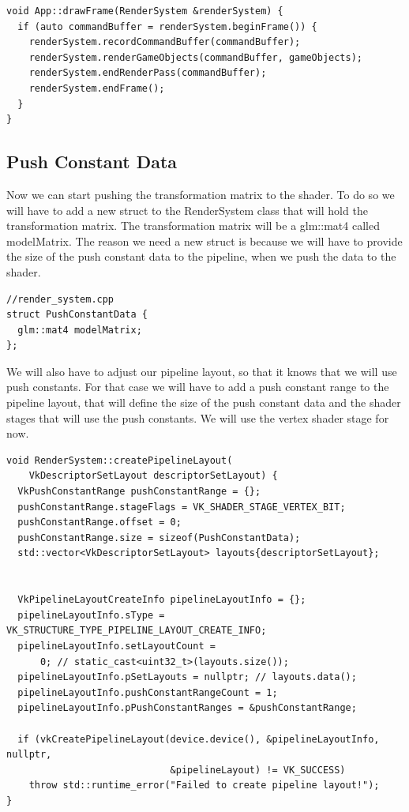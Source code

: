 \documentclass[12pt]{report} \usepackage{preamble}
\begin{document}
\begin{lstlisting}[Language=C++]
void App::drawFrame(RenderSystem &renderSystem) {
  if (auto commandBuffer = renderSystem.beginFrame()) {
    renderSystem.recordCommandBuffer(commandBuffer);
    renderSystem.renderGameObjects(commandBuffer, gameObjects);
    renderSystem.endRenderPass(commandBuffer);
    renderSystem.endFrame();
  }
}
\end{lstlisting}

\subsection{Push Constant Data}

Now we can start pushing the transformation matrix to the shader. To do so we will have to add a new struct to the RenderSystem class that will hold the transformation matrix.
The transformation matrix will be a glm::mat4 called modelMatrix. The reason we need a new struct is because we will have to provide the size of the push constant data to the pipeline,
when we push the data to the shader.

\begin{lstlisting}[Language=C++]
//render_system.cpp
struct PushConstantData {
  glm::mat4 modelMatrix;
};
\end{lstlisting}

We will also have to adjust our pipeline layout, so that it knows that we will use push constants. For that case we will have to add a push constant range to the pipeline layout,
that will define the size of the push constant data and the shader stages that will use the push constants. We will use the vertex shader stage for now.

\begin{lstlisting}[Language=C++]
void RenderSystem::createPipelineLayout(
    VkDescriptorSetLayout descriptorSetLayout) {
  VkPushConstantRange pushConstantRange = {};
  pushConstantRange.stageFlags = VK_SHADER_STAGE_VERTEX_BIT;
  pushConstantRange.offset = 0;
  pushConstantRange.size = sizeof(PushConstantData);
  std::vector<VkDescriptorSetLayout> layouts{descriptorSetLayout};


  VkPipelineLayoutCreateInfo pipelineLayoutInfo = {};
  pipelineLayoutInfo.sType = VK_STRUCTURE_TYPE_PIPELINE_LAYOUT_CREATE_INFO;
  pipelineLayoutInfo.setLayoutCount =
      0; // static_cast<uint32_t>(layouts.size());
  pipelineLayoutInfo.pSetLayouts = nullptr; // layouts.data();
  pipelineLayoutInfo.pushConstantRangeCount = 1;
  pipelineLayoutInfo.pPushConstantRanges = &pushConstantRange;

  if (vkCreatePipelineLayout(device.device(), &pipelineLayoutInfo, nullptr,
                             &pipelineLayout) != VK_SUCCESS)
    throw std::runtime_error("Failed to create pipeline layout!");
}
\end{lstlisting}
\end{document}

